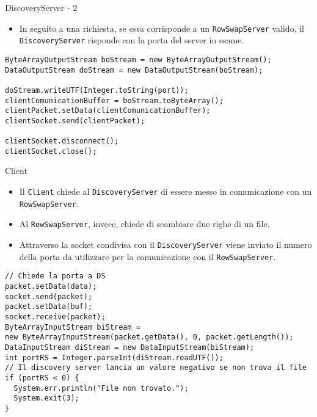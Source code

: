\documentclass[8pt]{beamer}
\begin{document}
\begin{frame}[fragile]{DiscoveryServer - 2}
\begin{itemize}
\item In seguito a una richiesta, se essa corrisponde a un \texttt{RowSwapServer} valido, il \texttt{DiscoveryServer} risponde con la porta del server in esame.
\end{itemize}
\begin{verbatim}
ByteArrayOutputStream boStream = new ByteArrayOutputStream();
DataOutputStream doStream = new DataOutputStream(boStream);

doStream.writeUTF(Integer.toString(port));
clientComunicationBuffer = boStream.toByteArray();
clientPacket.setData(clientComunicationBuffer);
clientSocket.send(clientPacket);

clientSocket.disconnect();
clientSocket.close();

\end{verbatim}
\end{frame}
\begin{frame}[fragile]{Client}
\begin{itemize}
\item Il \texttt{Client} chiede al \texttt{DiscoveryServer} di essere messo in comunicazione con un \texttt{RowSwapServer}.
\item Al \texttt{RowSwapServer}, invece, chiede di scambiare due righe di un file.
\item Attraverso la socket condivisa con il \texttt{DiscoveryServer} viene inviato il numero della porta da utilizzare per la comunicazione con il \texttt{RowSwapServer}.
\end{itemize}
\vspace{1em}
\begin{verbatim}
// Chiede la porta a DS
packet.setData(data);
socket.send(packet);
packet.setData(buf);
socket.receive(packet);
ByteArrayInputStream biStream = 
new ByteArrayInputStream(packet.getData(), 0, packet.getLength());
DataInputStream diStream = new DataInputStream(biStream);
int portRS = Integer.parseInt(diStream.readUTF());
// Il discovery server lancia un valore negativo se non trova il file
if (portRS < 0) { 
  System.err.println("File non trovato.");
  System.exit(3);
}
\end{verbatim}
\end{frame}
\end{document}
